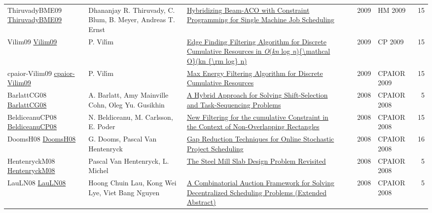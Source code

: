 {\begin{longtable}{p{3cm}p{6cm}p{7cm}rrrp{3cm}r}
ThiruvadyBME09 \href{https://doi.org/10.1007/978-3-642-04918-7\_3}{ThiruvadyBME09} & Dhananjay R. Thiruvady, C. Blum, B. Meyer, Andreas T. Ernst & \href{papers/ThiruvadyBME09.pdf}{Hybridizing Beam-ACO with Constraint Programming for Single Machine Job Scheduling} &  & \cite{ThiruvadyBME09} & 2009 & HM 2009 & 15\\
Vilim09 \href{https://doi.org/10.1007/978-3-642-04244-7\_62}{Vilim09} & P. Vil{\'{\i}}m & \href{papers/Vilim09.pdf}{Edge Finding Filtering Algorithm for Discrete Cumulative Resources in \emph{O}(\emph{kn} log \emph{n})\{{\textbackslash}mathcal O\}(kn \{{\textbackslash}rm log\} n)} &  & \cite{Vilim09} & 2009 & CP 2009 & 15\\
cpaior-Vilim09 \href{https://doi.org/10.1007/978-3-642-01929-6\_22}{cpaior-Vilim09} & P. Vil{\'{\i}}m & \href{papers/cpaior-Vilim09.pdf}{Max Energy Filtering Algorithm for Discrete Cumulative Resources} &  & \cite{cpaior-Vilim09} & 2009 & CPAIOR 2009 & 15\\
BarlattCG08 \href{https://doi.org/10.1007/978-3-540-68155-7\_24}{BarlattCG08} & A. Barlatt, Amy Mainville Cohn, Oleg Yu. Gusikhin & \href{papers/BarlattCG08.pdf}{A Hybrid Approach for Solving Shift-Selection and Task-Sequencing Problems} &  & \cite{BarlattCG08} & 2008 & CPAIOR 2008 & 5\\
BeldiceanuCP08 \href{https://doi.org/10.1007/978-3-540-68155-7\_5}{BeldiceanuCP08} & N. Beldiceanu, M. Carlsson, E. Poder & \href{papers/BeldiceanuCP08.pdf}{New Filtering for the cumulative Constraint in the Context of Non-Overlapping Rectangles} &  & \cite{BeldiceanuCP08} & 2008 & CPAIOR 2008 & 15\\
DoomsH08 \href{https://doi.org/10.1007/978-3-540-68155-7\_8}{DoomsH08} & G. Dooms, Pascal Van Hentenryck & \href{papers/DoomsH08.pdf}{Gap Reduction Techniques for Online Stochastic Project Scheduling} &  & \cite{DoomsH08} & 2008 & CPAIOR 2008 & 16\\
HentenryckM08 \href{https://doi.org/10.1007/978-3-540-68155-7\_41}{HentenryckM08} & Pascal Van Hentenryck, L. Michel & \href{papers/HentenryckM08.pdf}{The Steel Mill Slab Design Problem Revisited} &  & \cite{HentenryckM08} & 2008 & CPAIOR 2008 & 5\\
LauLN08 \href{https://doi.org/10.1007/978-3-540-68155-7\_33}{LauLN08} & Hoong Chuin Lau, Kong Wei Lye, Viet Bang Nguyen & \href{papers/LauLN08.pdf}{A Combinatorial Auction Framework for Solving Decentralized Scheduling Problems (Extended Abstract)} &  & \cite{LauLN08} & 2008 & CPAIOR 2008 & 5\\

\end{longtable}}
